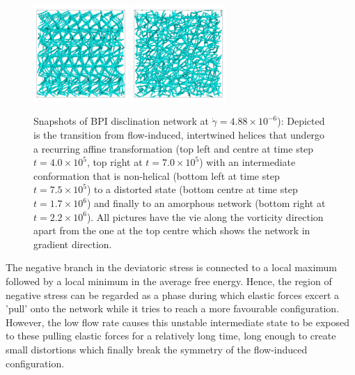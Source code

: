 \documentclass[aps,pre,reprint,superscriptaddress, twocolumn]{revtex4}
\newcommand{\e}[1]{\times10^{#1}}
\begin{document}
\begin{figure}[htpb]
\includegraphics[width=0.32\textwidth]{disc-xy-1700k_run1115.png}
\includegraphics[width=0.32\textwidth]{disc-xy-2200k_run1115.png}
\caption{Snapshots of BPI disclination network at $\dot{\gamma}=4.88\e{-6}$): 
Depicted is the transition from flow-induced, intertwined helices that 
undergo a recurring affine transformation (top left and centre at 
time step $t=4.0\e{5}$, top right at $t=7.0\e{5}$) with an intermediate 
conformation that is non-helical (bottom left at time step $t=7.5\e{5}$) 
to a distorted state (bottom centre at time step $t=1.7\e{6}$) and 
finally to an amorphous network (bottom right at $t=2.2\e{6}$). 
All pictures have the vie along the vorticity direction apart from the 
one at the top centre which shows the network in gradient direction.}
\label{bp1-low}
\end{figure}

The negative branch in the deviatoric stress is connected
to a local maximum followed by a local minimum in the average free energy.
Hence, the region of negative stress can be 
regarded as a phase during which elastic forces excert a 
'pull' onto the network while it tries to reach a more 
favourable configuration. However, the low flow rate
causes this unstable intermediate state to be exposed to these
pulling elastic forces for a relatively long time, long enough to 
create small distortions which finally break the symmetry of the
flow-induced configuration.
\end{document}
